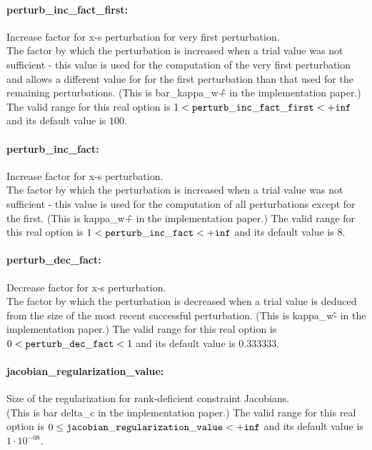 \paragraph{perturb\_inc\_fact\_first:}\label{opt:perturb_inc_fact_first} Increase factor for x-s perturbation for very first perturbation. \\
 The factor by which the perturbation is increased when a trial value was not sufficient - this value is used for the computation of the very first perturbation and allows a different value for for the first perturbation than that used for the remaining perturbations. (This is bar\_kappa\_w\^+ in the implementation paper.) The valid range for this real option is 
$1 <  {\tt perturb\_inc\_fact\_first } <  {\tt +inf}$
and its default value is $100$.


\paragraph{perturb\_inc\_fact:}\label{opt:perturb_inc_fact} Increase factor for x-s perturbation. \\
 The factor by which the perturbation is increased when a trial value was not sufficient - this value is used for the computation of all perturbations except for the first. (This is kappa\_w\^+ in the implementation paper.) The valid range for this real option is 
$1 <  {\tt perturb\_inc\_fact } <  {\tt +inf}$
and its default value is $8$.


\paragraph{perturb\_dec\_fact:}\label{opt:perturb_dec_fact} Decrease factor for x-s perturbation. \\
 The factor by which the perturbation is decreased when a trial value is deduced from the size of the most recent successful perturbation. (This is kappa\_w\^- in the implementation paper.) The valid range for this real option is 
$0 <  {\tt perturb\_dec\_fact } <  1$
and its default value is $0.333333$.


\paragraph{jacobian\_regularization\_value:}\label{opt:jacobian_regularization_value} Size of the regularization for rank-deficient constraint Jacobians. \\
 (This is bar delta\_c in the implementation paper.) The valid range for this real option is 
$0 \le {\tt jacobian\_regularization\_value } <  {\tt +inf}$
and its default value is $1 \cdot 10^{-08}$.


